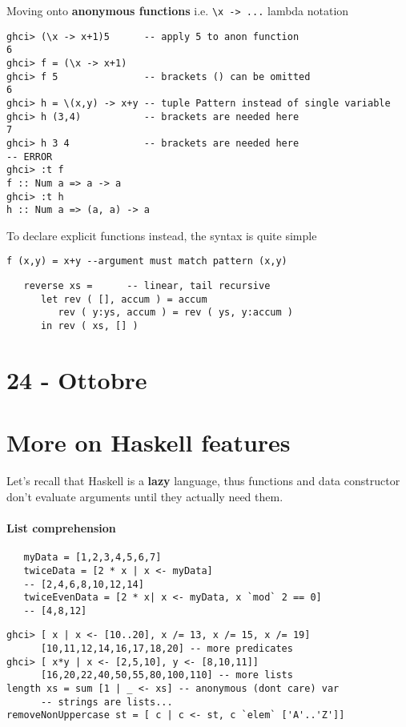 Moving onto \textbf{anonymous functions} i.e. \lstinline|\x -> ...| lambda notation
\begin{lstlisting}
ghci> (\x -> x+1)5      -- apply 5 to anon function
6
ghci> f = (\x -> x+1)
ghci> f 5               -- brackets () can be omitted
6
ghci> h = \(x,y) -> x+y -- tuple Pattern instead of single variable
ghci> h (3,4)           -- brackets are needed here
7
ghci> h 3 4             -- brackets are needed here
-- ERROR
ghci> :t f
f :: Num a => a -> a
ghci> :t h
h :: Num a => (a, a) -> a
\end{lstlisting}

To declare explicit functions instead, the syntax is quite simple
\begin{lstlisting}
f (x,y) = x+y --argument must match pattern (x,y)
\end{lstlisting}

\begin{lstlisting}
   reverse xs =      -- linear, tail recursive
      let rev ( [], accum ) = accum
         rev ( y:ys, accum ) = rev ( ys, y:accum )
      in rev ( xs, [] )
\end{lstlisting}


\section*{24 - Ottobre}
\section{More on Haskell features}
Let's recall that Haskell is a \textbf{lazy} language,
thus functions and data constructor don't evaluate arguments until they actually need them.

\paragraph{List comprehension}
\begin{lstlisting}
   myData = [1,2,3,4,5,6,7]
   twiceData = [2 * x | x <- myData]
   -- [2,4,6,8,10,12,14]
   twiceEvenData = [2 * x| x <- myData, x `mod` 2 == 0]
   -- [4,8,12]
\end{lstlisting}

\begin{lstlisting}
ghci> [ x | x <- [10..20], x /= 13, x /= 15, x /= 19]
      [10,11,12,14,16,17,18,20] -- more predicates
ghci> [ x*y | x <- [2,5,10], y <- [8,10,11]]
      [16,20,22,40,50,55,80,100,110] -- more lists
length xs = sum [1 | _ <- xs] -- anonymous (dont care) var
      -- strings are lists...
removeNonUppercase st = [ c | c <- st, c `elem` ['A'..'Z']]
\end{lstlisting}

